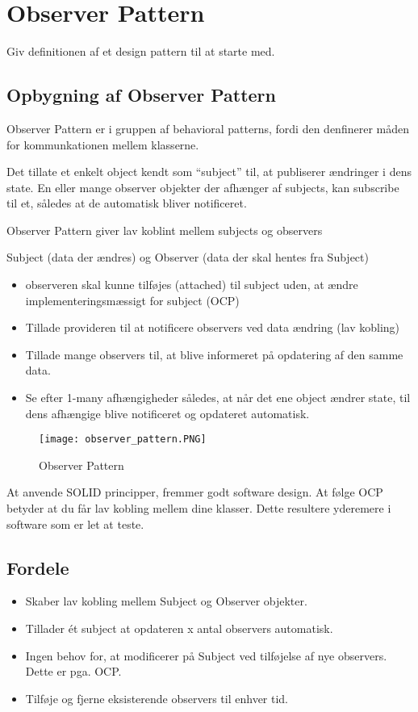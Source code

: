 \documentclass[../SWD_disp.tex]{subfiles}
\begin{document}
\section{Observer Pattern}

Giv definitionen af et design pattern til at starte med.

\subsection{Opbygning af Observer Pattern}
Observer Pattern er i gruppen af behavioral patterns, fordi den denfinerer måden for kommunkationen mellem klasserne.


Det tillate et enkelt object kendt som ``subject'' til, at publiserer ændringer i dens state. En eller mange observer objekter der afhænger af subjects, kan subscribe til et, således at de automatisk bliver notificeret.


Observer Pattern giver lav koblint mellem subjects og observers


Subject (data der ændres) og Observer (data der skal hentes fra Subject)
\begin{itemize}
    \item observeren skal kunne tilføjes (attached) til subject uden, at ændre implementeringsmæssigt for subject (OCP)
    \item Tillade provideren til at notificere observers ved data ændring (lav kobling)
    \item Tillade mange observers til, at blive informeret på opdatering af den samme data.
    \item Se efter 1-many afhængigheder således, at når det ene object ændrer state, til dens afhængige blive notificeret og opdateret automatisk.
\end{itemize}

\begin{figure}[H]
    \centering
    \texttt{[image: observer\_pattern.PNG]}
    \caption{Observer Pattern}
    \label{fig:observer_pattern}
\end{figure}

At anvende SOLID principper, fremmer godt software design. At følge OCP betyder at du får lav kobling mellem dine klasser. Dette resultere yderemere i software som er let at teste.

\subsection*{Fordele}
\begin{itemize}
    \item Skaber lav kobling mellem Subject og Observer objekter.
    \item Tillader ét subject at opdateren x antal observers automatisk. 
    \item Ingen behov for, at modificerer på Subject ved tilføjelse af nye observers. Dette er pga. OCP.
    \item Tilføje og fjerne eksisterende observers til enhver tid.
\end{itemize}
\end{document}
